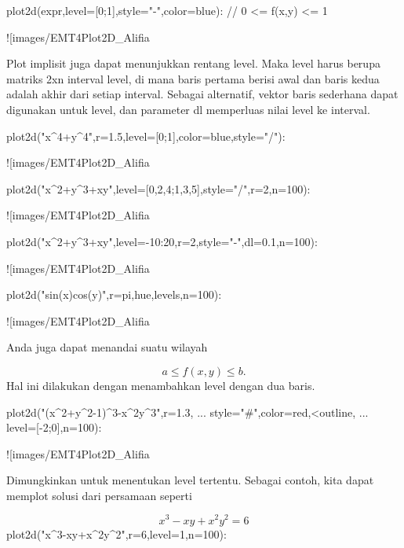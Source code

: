 \documentclass{article}
\begin{document}
\>plot2d(expr,level=[0;1],style="-",color=blue): // 0 <= f(x,y) <= 1


![images/EMT4Plot2D_Alifia%

Plot implisit juga dapat menunjukkan rentang level. Maka level harus
berupa matriks 2xn interval level, di mana baris pertama berisi awal
dan baris kedua adalah akhir dari setiap interval. Sebagai alternatif,
vektor baris sederhana dapat digunakan untuk level, dan parameter dl
memperluas nilai level ke interval.


\>plot2d("x^4+y^4",r=1.5,level=[0;1],color=blue,style="/"):


![images/EMT4Plot2D_Alifia%

\>plot2d("x^2+y^3+x\*y",level=[0,2,4;1,3,5],style="/",r=2,n=100):


![images/EMT4Plot2D_Alifia%

\>plot2d("x^2+y^3+x\*y",level=-10:20,r=2,style="-",dl=0.1,n=100):


![images/EMT4Plot2D_Alifia%

\>plot2d("sin(x)\*cos(y)",r=pi,\>hue,\>levels,n=100):


![images/EMT4Plot2D_Alifia%

Anda juga dapat menandai suatu wilayah


$$a \le f(x,y) \le b.$$Hal ini dilakukan dengan menambahkan level dengan dua baris.


\>plot2d("(x^2+y^2-1)^3-x^2\*y^3",r=1.3, ...  
\>     style="#",color=red,<outline, ...  
\>     level=[-2;0],n=100):


![images/EMT4Plot2D_Alifia%

Dimungkinkan untuk menentukan level tertentu. Sebagai contoh, kita
dapat memplot solusi dari persamaan seperti


$$x^3-xy+x^2y^2=6$$\>plot2d("x^3-x\*y+x^2\*y^2",r=6,level=1,n=100):
\end{document}
